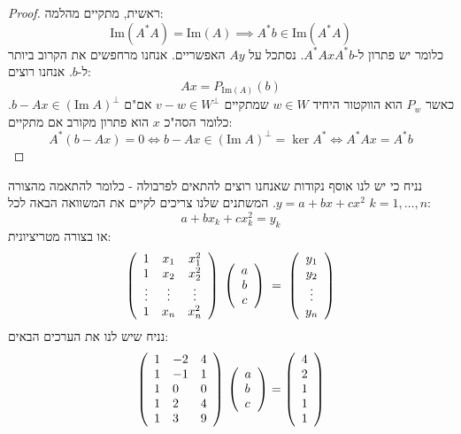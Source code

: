 \documentclass{tstextbook}
\begin{document}
\begin{proof}
ראשית, מתקיים מהלמה:
$$\mathrm{Im}(A^{*}A)=\mathrm{Im}(A)\implies A^{*}b \in \mathrm{Im}(A^{*}A)$$
כלומר יש פתרון ל-\(A^{*}AxA^{*}b\). נסתכל על \(Ay\) האפשריים. אנחנו מרחפשים את הקרוב ביותר ל-\(b\). אנחנו רוצים:
$$Ax=P_{\mathrm{Im}(A)}(b)$$
כאשר \(P_{w}\) הוא הווקטור היחיד \(w \in W\) שמתקיים \(v-w\in W^{\perp}\) אם"ם \(b-Ax \in \left( \mathrm{Im}\;A \right)^{\perp}\). כלומר הסה"כ \(x\) הוא פתרון מקורב אם מתקיים:
$$A^{*}(b-Ax)=0\iff b-Ax \in \left( \mathrm{Im}\;A \right)^{\perp}=\ker A^{*}\iff A^{*}Ax=A^{*}b$$

\end{proof}
\begin{example}
נניח כי יש לנו אוסף נקודות שאנחנו רוצים להתאים לפרבולה - כלומר להתאמה מהצורה \(y=a+bx+cx^{2}\). המשתנים שלנו צריכים לקיים את המשוואה הבאה לכל \(k=1,\dots, n\):
$$a+bx_{k}+cx^{2}_{k}=y_{k}$$
או בצורה מטריציונית:
$$\left(\begin{array}{c c c}{{1}}&{{x_{1}}}&{{x_{1}^{2}}}\\ {{1}}&{{x_{2}}}&{{x_{2}^{2}}}\\ {{\vdots}}&{{\vdots}}&{{\vdots}}\\ {{1}}&{{x_{n}}}&{{x_{n}^{2}}}\end{array}\right)\;\left(\begin{array}{c}{{a}}\\ {{b}}\\ {{c}}\end{array}\right)\;=\;\left(\begin{array}{c}{{y_{1}}}\\ {{y_{2}}}\\ {{\vdots}}\\ {{y_{n}}}\end{array}\right)$$
נניח שיש לנו את הערכים הבאים:
$${\left(\begin{array}{l l l}{1}&{-2}&{4}\\ {1}&{-1}&{1}\\ {1}&{0}&{0}\\ {1}&{2}&{4}\\ {1}&{3}&{9}\end{array}\right)}\ {\left(\begin{array}{l}{a}\\ {b}\\ {c}\end{array}\right)}={\left(\begin{array}{l}{4}\\ {2}\\ {1}\\ {1}\\ {1}\end{array}\right)}$$

\end{example}
\end{document}
